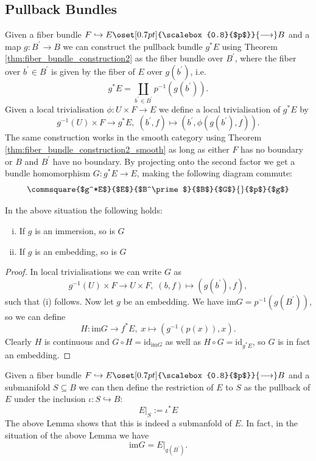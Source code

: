 \subsection{Pullback Bundles}

    Given a fiber bundle $F \hookrightarrow E \oset[0.7pt]{\scalebox{0.8}{$p$}}{\longrightarrow} B$ and a map $g \colon B^\prime \to B$ we can construct the pullback bundle $g^*E$ using Theorem \ref{thm:fiber_bundle_construction2} as the fiber bundle over $B^\prime$, where the fiber over $b^\prime \in B^\prime$ is given by the fiber of $E$ over $g(b^\prime)$, i.e.
    \[
    g^*E = \coprod_{b^\prime \in B^\prime} p^{-1}(g(b^\prime)).
    \]
    Given a local trivialisation $\phi \colon U \times F \to E$ we define a local trivialisation of $g^*E$ by
    \[
    g^{-1}(U) \times F \to g^*E, \; (b^\prime,f) \mapsto (b^\prime,\phi(g(b^\prime),f)).
    \]
    The same construction works in the smooth category using Theorem \ref{thm:fiber_bundle_construction2_smooth} as long as either $F$ has no boundary or $B$ and $B^\prime$ have no boundary. By projecting onto the second factor we get a bundle homomorphism $G \colon g^*E \to E$, making the following diagram commute:
    \[
        \commsquare{$g^*E$}{$E$}{$B^\prime$}{$B$}{$G$}{}{$p$}{$g$}
    \]

    \begin{lemma}
        \label{lem:pullback_of_bundle_under_embedding}
        In the above situation the following holds:
        \begin{enumerate}[(i)]
            \item If $g$ is an immersion, so is $G$
            \item If $g$ is an embedding, so is $G$
        \end{enumerate}
    \end{lemma}
   \begin{proof}
    In local trivialisations we can write $G$ as
    \[
    g^{-1}(U) \times F \to U \times F, \; (b,f) \mapsto (g(b^\prime),f),
    \]
    such that (i) follows. Now let $g$ be an embedding. We have $\mathrm{im} G = p^{-1}(g(B^\prime))$, so we can define 
    \[
    H \colon \mathrm{im} G \to f^*E, \; x \mapsto (g^{-1}(p(x)),x).
    \]
    Clearly $H$ is continuous and $G \circ H = \mathrm{id}_{\mathrm{im} G}$ as well as $H \circ G = \mathrm{id}_{g^*E}$, so $G$ is in fact an embedding.
   \end{proof}

   Given a fiber bundle $F \hookrightarrow E \oset[0.7pt]{\scalebox{0.8}{$p$}}{\longrightarrow} B$ and a submanifold $S \subseteq B$ we can then define the restriction of $E$ to $S$ as the pullback of $E$ under the inclusion $\iota \colon S \hookrightarrow B$:
   \[
   E|_S := \iota^*E
   \]
   The above Lemma shows that this is indeed a submanfold of $E$. In fact, in the situation of the above Lemma we have $$\mathrm{im} G = E|_{g(B^\prime)}.$$

